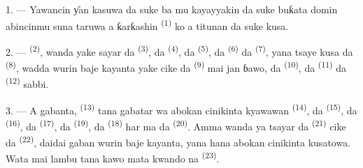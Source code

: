 %

\VUsaut{4.0mm}
\VUsaut{3.0mm}

\VUsaut{3.0mm}

1. --- Yawancin ƴan kasuwa da suke ba mu kayayyakin da suke buƙata
domin abincinmu suna taruwa a ƙarƙashin 
\textsuperscript{(1)}  ko a titunan da suke kusa.

2. ---  \textsuperscript{(2)}, wanda yake
sayar da  \textsuperscript{(3)}, da
 \textsuperscript{(4)}, da 
\textsuperscript{(5)}, da  \textsuperscript{(6)} da
 \textsuperscript{(7)}, yana tsaye kusa da  \textsuperscript{(8)}, wadda wurin baje kayanta yake
cike da  \textsuperscript{(9)} mai jan ɓawo, da
 \textsuperscript{(10)}, da 
\textsuperscript{(11)} da  \textsuperscript{(12)} sabbi.

3. --- A gabanta, 
\textsuperscript{(13)} tana gabatar wa abokan cinikinta kyawawan
 \textsuperscript{(14)}, da 
\textsuperscript{(15)}, da  \textsuperscript{(16)}, da
 \textsuperscript{(17)}, da 
\textsuperscript{(19)}, da  \textsuperscript{(18)} har ma da
 \textsuperscript{(20)}. Amma 
wanda ya tsayar da  \textsuperscript{(21)} cike da
 \textsuperscript{(22)}, daidai gaban wurin baje
kayanta, yana hana abokan cinikinta kusatowa. Wata mai lambu tana
kawo mata kwando na  \textsuperscript{(23)}.

